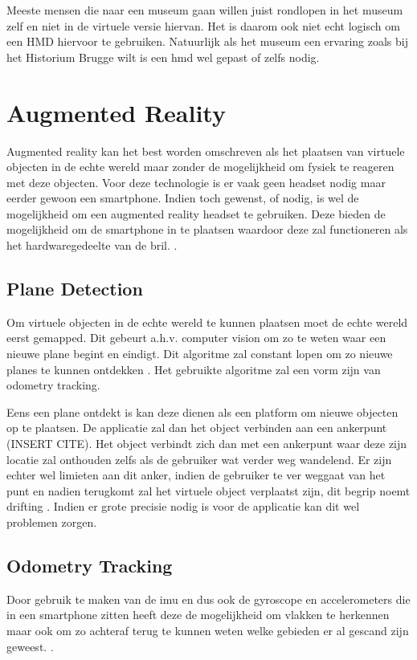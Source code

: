 Meeste mensen die naar een museum gaan willen juist rondlopen in het museum zelf en niet in de virtuele versie hiervan. Het is daarom ook niet echt logisch om een HMD hiervoor te gebruiken. Natuurlijk als het museum een ervaring zoals bij het Historium Brugge wilt is een \acrshort{hmd} wel gepast of zelfs nodig.

\section{Augmented Reality} \label{sec:augmentedreality}
Augmented reality kan het best worden omschreven als het plaatsen van virtuele objecten in de echte wereld maar zonder de mogelijkheid om fysiek te reageren met deze objecten. Voor deze technologie is er vaak geen headset nodig maar eerder gewoon een smartphone. Indien toch gewenst, of nodig, is wel de mogelijkheid om een augmented reality headset te gebruiken. Deze bieden de mogelijkheid om de smartphone in te plaatsen waardoor deze zal functioneren als het hardwaregedeelte van de bril. \autocite{Schops2014}.

\subsection{Plane Detection}
Om virtuele objecten in de echte wereld te kunnen plaatsen moet de echte wereld eerst gemapped. Dit gebeurt a.h.v. computer vision om zo te weten waar een nieuwe plane begint en eindigt. Dit algoritme zal constant lopen om zo nieuwe planes te kunnen ontdekken \autocite{Xu2018}. Het gebruikte algoritme zal een vorm zijn van odometry tracking.

Eens een plane ontdekt is kan deze dienen als een platform om nieuwe objecten op te plaatsen. De applicatie zal dan het object verbinden aan een ankerpunt (INSERT CITE). Het object verbindt zich dan met een ankerpunt waar deze zijn locatie zal onthouden zelfs als de gebruiker wat verder weg wandelend. Er zijn echter wel limieten aan dit anker, indien de gebruiker te ver weggaat van het punt en nadien terugkomt zal het virtuele object verplaatst zijn, dit begrip noemt drifting \autocite{You1999}. Indien er grote precisie nodig is voor de applicatie kan dit wel problemen zorgen.

\subsection{Odometry Tracking}

Door gebruik te maken van de \acrshort{imu} en dus ook de gyroscope en accelerometers die in een smartphone zitten heeft deze de mogelijkheid om vlakken te herkennen maar ook om zo achteraf terug te kunnen weten welke gebieden er al gescand zijn geweest. \autocite{Leutenegger2015}.

